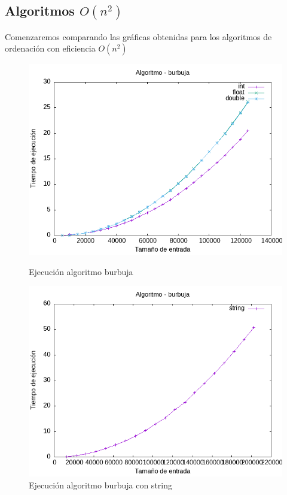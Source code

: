 \documentclass[11pt]{article}
\begin{document}
    \subsection{Algoritmos  \(O(n^2)\)}
    Comenzaremos comparando las gráficas obtenidas para los algoritmos de ordenación con eficiencia \(O(n^2)\)
    \begin{figure}[H]
        \begin{minipage}{0.5\textwidth}
            \centering
            \includegraphics[width=\linewidth]{assets/Img/burbuja.png}
            \caption{Ejecución algoritmo burbuja}
            \label{fig:burbuja}
        \end{minipage}%
        \begin{minipage}{0.5\textwidth}
            \centering
            \includegraphics[width=\linewidth]{assets/Img/burbujastring.png}
            \caption{Ejecución algoritmo burbuja con string}
            \label{fig:burbujastring}
        \end{minipage}
    \end{figure}
\end{document}
